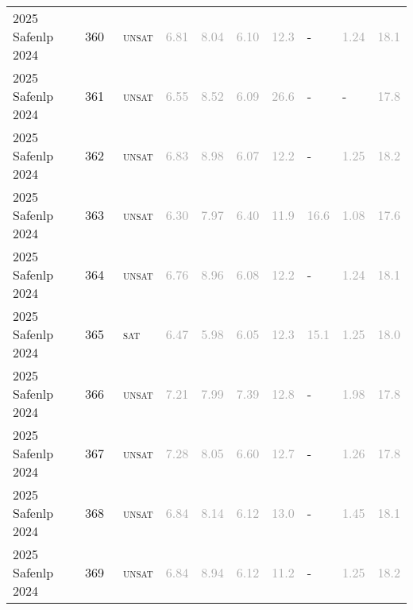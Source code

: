 \begin{center}
{\begin{longtable}{@{}llllllllll@{}}
2025 Safenlp 2024 & 360 & ~\textsc{unsat} & \textcolor{darkgray}{6.81} & \textcolor{darkgray}{8.04} & \textcolor{darkgray}{6.10} & \textcolor{darkgray}{12.3} & - & \textcolor{darkgray}{1.24} & \textcolor{darkgray}{18.1} \\
2025 Safenlp 2024 & 361 & ~\textsc{unsat} & \textcolor{darkgray}{6.55} & \textcolor{darkgray}{8.52} & \textcolor{darkgray}{6.09} & \textcolor{darkgray}{26.6} & - & - & \textcolor{darkgray}{17.8} \\
2025 Safenlp 2024 & 362 & ~\textsc{unsat} & \textcolor{darkgray}{6.83} & \textcolor{darkgray}{8.98} & \textcolor{darkgray}{6.07} & \textcolor{darkgray}{12.2} & - & \textcolor{darkgray}{1.25} & \textcolor{darkgray}{18.2} \\
2025 Safenlp 2024 & 363 & ~\textsc{unsat} & \textcolor{darkgray}{6.30} & \textcolor{darkgray}{7.97} & \textcolor{darkgray}{6.40} & \textcolor{darkgray}{11.9} & \textcolor{darkgray}{16.6} & \textcolor{darkgray}{1.08} & \textcolor{darkgray}{17.6} \\
2025 Safenlp 2024 & 364 & ~\textsc{unsat} & \textcolor{darkgray}{6.76} & \textcolor{darkgray}{8.96} & \textcolor{darkgray}{6.08} & \textcolor{darkgray}{12.2} & - & \textcolor{darkgray}{1.24} & \textcolor{darkgray}{18.1} \\
2025 Safenlp 2024 & 365 & ~\textsc{sat} & \textcolor{darkgray}{6.47} & \textcolor{darkgray}{5.98} & \textcolor{darkgray}{6.05} & \textcolor{darkgray}{12.3} & \textcolor{darkgray}{15.1} & \textcolor{darkgray}{1.25} & \textcolor{darkgray}{18.0} \\
2025 Safenlp 2024 & 366 & ~\textsc{unsat} & \textcolor{darkgray}{7.21} & \textcolor{darkgray}{7.99} & \textcolor{darkgray}{7.39} & \textcolor{darkgray}{12.8} & - & \textcolor{darkgray}{1.98} & \textcolor{darkgray}{17.8} \\
2025 Safenlp 2024 & 367 & ~\textsc{unsat} & \textcolor{darkgray}{7.28} & \textcolor{darkgray}{8.05} & \textcolor{darkgray}{6.60} & \textcolor{darkgray}{12.7} & - & \textcolor{darkgray}{1.26} & \textcolor{darkgray}{17.8} \\
2025 Safenlp 2024 & 368 & ~\textsc{unsat} & \textcolor{darkgray}{6.84} & \textcolor{darkgray}{8.14} & \textcolor{darkgray}{6.12} & \textcolor{darkgray}{13.0} & - & \textcolor{darkgray}{1.45} & \textcolor{darkgray}{18.1} \\
2025 Safenlp 2024 & 369 & ~\textsc{unsat} & \textcolor{darkgray}{6.84} & \textcolor{darkgray}{8.94} & \textcolor{darkgray}{6.12} & \textcolor{darkgray}{11.2} & - & \textcolor{darkgray}{1.25} & \textcolor{darkgray}{18.2} \\

\end{longtable}}
\end{center}
